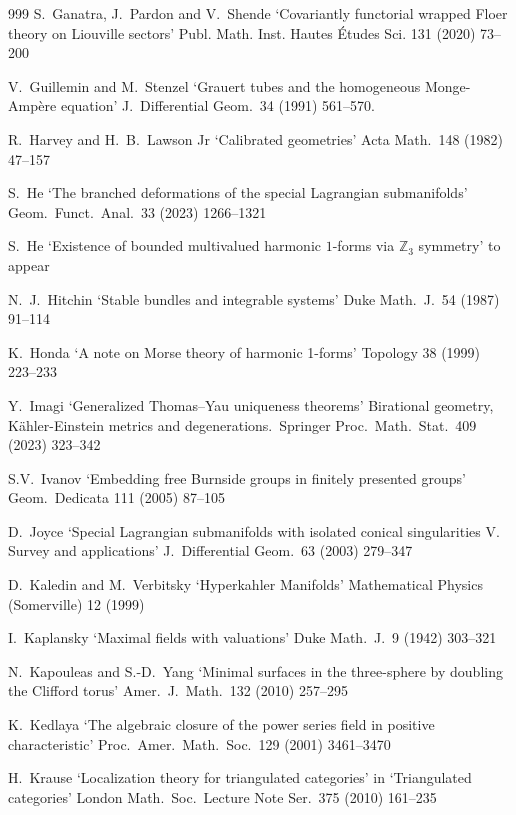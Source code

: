 \documentclass{article}
\theoremstyle{plain}%
\theoremstyle{definition}
\numberwithin{equation}{section}
\numberwithin{figure}{section}
\def\Z{{\mathbin{\mathbb Z}}}
\begin{document}
\begin{thebibliography}{999}
 S.\ Ganatra, J.\ Pardon and V.\ Shende `Covariantly functorial wrapped Floer theory on Liouville sectors'
Publ. Math. Inst. Hautes \'{E}tudes Sci. 131 (2020) 73--200

 V.\ Guillemin and M.\ Stenzel
`Grauert tubes and the homogeneous Monge-Amp\`ere equation'
J.\ Differential Geom.\ 34 (1991) 561--570.

 R.\ Harvey and H.\ B.\ Lawson Jr
`Calibrated geometries' Acta Math.\ 148 (1982) 47--157

S.\ He
`The branched deformations of the special Lagrangian submanifolds'
Geom.\ Funct.\ Anal.\ 33 (2023) 1266--1321

S.\ He
`Existence of bounded multivalued harmonic $1$-forms via $\Z_3$ symmetry'
to appear

 N.\ J.\ Hitchin
`Stable bundles and integrable systems' Duke Math.\ J.\ 54 (1987) 91--114

 K.\ Honda
`A note on Morse theory of harmonic 1-forms'
Topology 38 (1999) 223--233

Y.\ Imagi `Generalized Thomas--Yau uniqueness theorems' 
Birational geometry, Kähler-Einstein metrics and degenerations.\ Springer Proc.\ Math.\ Stat.\ 409 (2023) 323--342


S.V.\ Ivanov `Embedding free Burnside groups in finitely presented groups' Geom.\ Dedicata 111 (2005) 87--105

 D.\ Joyce
`Special Lagrangian submanifolds with isolated conical singularities V. Survey and applications'
J.\ Differential Geom.\ 63 (2003) 279--347

 D.\ Kaledin and M.\ Verbitsky
`Hyperkahler Manifolds'
Mathematical Physics (Somerville) 12 (1999)


I.\ Kaplansky
`Maximal fields with valuations'
Duke Math.\ J.\ 9 (1942) 303--321

 N.\ Kapouleas and S.-D.\ Yang
`Minimal surfaces in the three-sphere by doubling the Clifford torus'
Amer.\ J.\ Math.\ 132 (2010) 257--295

K.\ Kedlaya
`The algebraic closure of the power series field in positive characteristic'
Proc.\ Amer.\ Math.\ Soc.\ 129 (2001) 3461--3470

H.\ Krause `Localization theory for triangulated categories' 
in `Triangulated categories'
London Math.\ Soc.\ Lecture Note Ser.\ 375 (2010) 161--235


\end{thebibliography}
\end{document}
